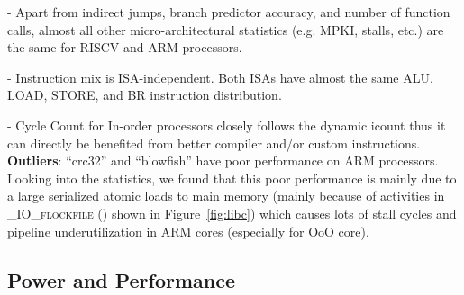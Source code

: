 - Apart from indirect jumps, branch predictor accuracy, and number of function calls, almost all other micro-architectural statistics (e.g. MPKI, stalls, etc.) are the same for RISCV and ARM processors.

- Instruction mix is ISA-independent. Both ISAs have almost the same ALU, LOAD, STORE, and BR instruction distribution. 

- Cycle Count for In-order processors closely follows the dynamic icount thus it can directly be benefited from better compiler and/or custom instructions. \\

\noindent \textbf{Outliers}: ``crc32'' and ``blowfish'' have poor performance on ARM processors. Looking into the statistics, we found that this poor performance is mainly due to a large serialized atomic loads to main memory (mainly because of activities in \textsc{\_IO\_flockfile ()} shown in Figure~\ref{fig:libc}) which causes lots of stall cycles and pipeline underutilization in ARM cores (especially for OoO core). 

\subsection{Power and Performance}






